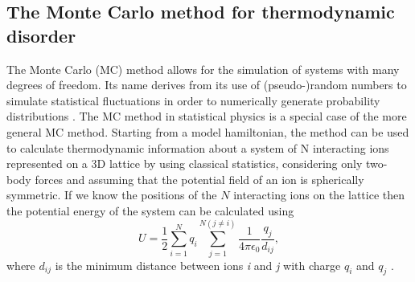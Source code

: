 \documentclass[11pt, twoside]{report}
\begin{document}
\subsection{The Monte Carlo method for thermodynamic disorder}
The Monte Carlo (MC) method allows for the simulation of systems with many degrees of freedom. Its name derives from its use of (pseudo-)random numbers to simulate statistical fluctuations in order to numerically generate probability distributions \cite{MC3}.
The MC method in statistical physics is a special case of the more general MC method.
Starting from a model hamiltonian, the method can be used to calculate thermodynamic information about a system of N interacting ions represented on a 3D lattice by using classical statistics, considering only two-body forces and assuming that the potential field of an ion is spherically symmetric. If we know the positions of the $N$ interacting ions on the lattice then the potential energy of the system can be calculated using
\begin{equation}\label{pot_E}
U = \frac{1}{2} \sum_{i=1}^N q_i \sum_{j=1}^{N(j \neq i)} \frac{1}{4 \pi \epsilon_0}\frac{q_j}{d_{ij}},
\end{equation}
where $d_{ij}$ is the minimum distance between ions \textit{i} and \textit{j} with charge $q_i$ and $q_j$  \cite{Metropolis}.
\end{document}

